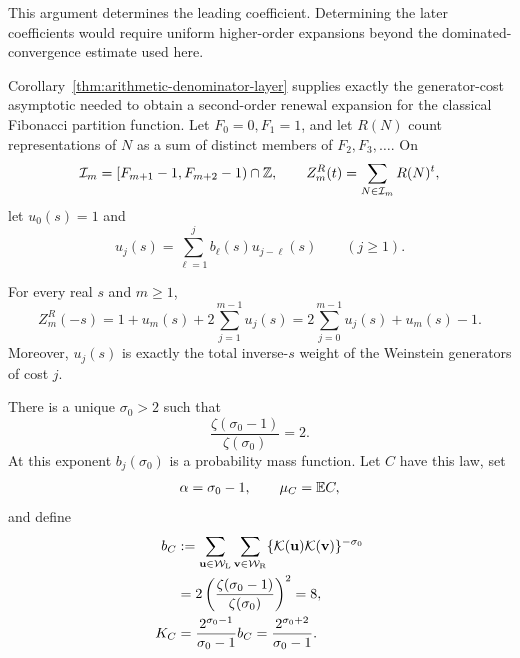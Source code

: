 This argument determines the leading coefficient.  Determining the later
coefficients would require uniform higher-order expansions beyond the
dominated-convergence estimate used here.

Corollary~\ref{thm:arithmetic-denominator-layer} supplies exactly the
generator-cost asymptotic needed to obtain a second-order renewal expansion
for the classical Fibonacci partition function.  Let \(F_0=0,F_1=1\), and
let \(R(N)\) count representations of \(N\) as a sum of distinct members of
\(F_2,F_3,\ldots\).  On
\[
 \mathcal I_m=[F_{m+1}-1,F_{m+2}-1)\cap\mathbb{Z},
 \qquad
 Z_m^R(t)=\sum_{N\in\mathcal I_m}R(N)^t,
\]
let \(u_0(s)=1\) and
\[
 u_j(s)=\sum_{\ell=1}^jb_\ell(s)u_{j-\ell}(s)\qquad(j\ge1).
\]

\begin{proposition}
\label{prop:weighted-generator-renewal}
For every real \(s\) and \(m\ge1\),
\begin{equation}
 Z_m^R(-s)
 =1+u_m(s)+2\sum_{j=1}^{m-1}u_j(s)
 =2\sum_{j=0}^{m-1}u_j(s)+u_m(s)-1.
 \label{eq:standard-layer-renewal}
\end{equation}
Moreover, \(u_j(s)\) is exactly the total inverse-\(s\) weight of the
Weinstein generators of cost \(j\).
\end{proposition}

There is a unique \(\sigma_0>2\) such that
\[
 \frac{\zeta(\sigma_0-1)}{\zeta(\sigma_0)}=2.
\]
At this exponent \(b_j(\sigma_0)\) is a probability mass function.  Let
\(C\) have this law, set
\[
 \alpha=\sigma_0-1,\qquad \mu_C=\mathbb{E} C,
\]
and define
\begin{equation}
 \begin{aligned}
  b_C&:=
  \sum_{\mathbf u\in\mathcal W_{\rm L}}
  \sum_{\mathbf v\in\mathcal W_{\rm R}}
  \{\mathcal K(\mathbf u)\mathcal K(\mathbf v)\}^{-\sigma_0}\\
  &=2\left(\frac{\zeta(\sigma_0-1)}{\zeta(\sigma_0)}\right)^2=8,\\
  K_C&=\frac{2^{\sigma_0-1}}{\sigma_0-1}b_C
  =\frac{2^{\sigma_0+2}}{\sigma_0-1}.
 \end{aligned}
 \label{eq:critical-tail-constants}
\end{equation}

